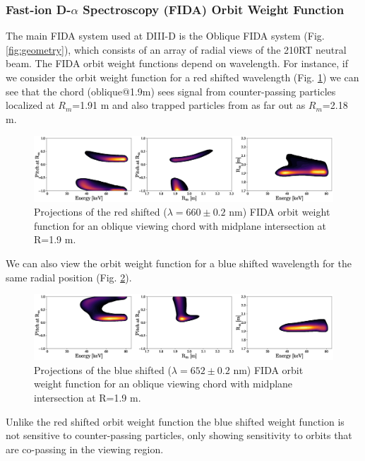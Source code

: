\subsubsection{Fast-ion D-$\alpha$ Spectroscopy (FIDA) Orbit Weight Function}
The main FIDA system used at DIII-D is the Oblique FIDA system (Fig. \ref{fig:geometry}), which consists of an array of radial views of the 210RT neutral beam.
The FIDA orbit weight functions depend on wavelength.
For instance, if we consider the orbit weight function for a red shifted wavelength (Fig. \ref{fig:fida_red}) we can see that the chord (oblique@1.9m) sees signal from counter-passing particles localized at $R_m$=1.91 m and also trapped particles from as far out as $R_m$=2.18 m. 
\begin{figure}[h!]
    \centering
    \includegraphics[width=15cm]{figures/fida_orbit_weight_red_14.eps}
    \caption{Projections of the red shifted ($\lambda = 660 \pm 0.2$ nm) FIDA orbit weight function for an oblique viewing chord with midplane intersection at R=1.9 m.}
    \label{fig:fida_red}
\end{figure}

We can also view the orbit weight function for a blue shifted wavelength for the same radial position (Fig. \ref{fig:fida_blue}). 
\begin{figure}[h!]
    \centering
    \includegraphics[width=15cm]{figures/fida_orbit_weight_blue_14.eps}
    \caption{Projections of the blue shifted ($\lambda = 652 \pm 0.2$ nm) FIDA orbit weight function for an oblique viewing chord with midplane intersection at R=1.9 m.}
    \label{fig:fida_blue}
\end{figure}
Unlike the red shifted orbit weight function the blue shifted weight function is not sensitive to counter-passing particles, only showing sensitivity to orbits that are co-passing in the viewing region.

